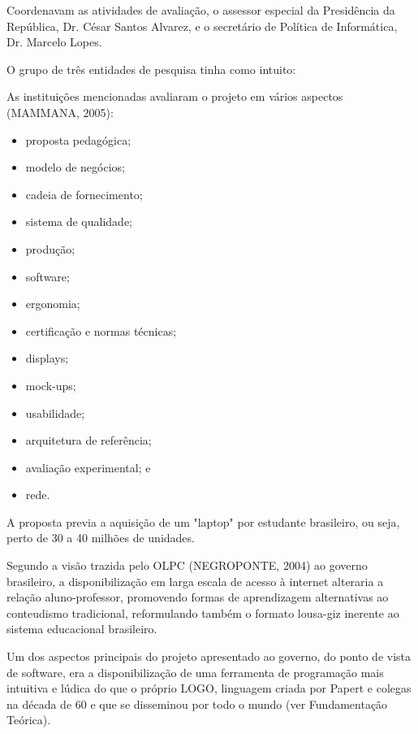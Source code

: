 Coordenavam as atividades de avaliação, o assessor especial da Presidência da República, Dr. César Santos Alvarez, e o secretário de Política de Informática, Dr. Marcelo Lopes.

O grupo de três entidades de pesquisa tinha como intuito:


\noindent\begin{center}\mbox{\centering{}}\end{center}


As instituições mencionadas avaliaram o projeto em vários aspectos  (MAMMANA, 2005):


\begin{itemize}
\item proposta pedagógica;
\item modelo de negócios;
\item cadeia de fornecimento;
\item sistema de qualidade;
\item produção;
\item software;
\item ergonomia;
\item certificação e normas técnicas;
\item displays;
\item mock-ups;
\item usabilidade;
\item arquitetura de referência;
\item avaliação experimental; e
\item rede.
\end{itemize}

A proposta previa a aquisição de um "laptop" por estudante brasileiro, ou seja, perto de 30 a 40 milhões de unidades.

Segundo a visão trazida pelo OLPC  (NEGROPONTE, 2004) ao governo brasileiro, a disponibilização em larga escala de acesso à internet alteraria a relação aluno-professor, promovendo formas de aprendizagem alternativas ao conteudismo tradicional, reformulando também o formato lousa-giz inerente ao sistema educacional brasileiro.

Um dos aspectos principais do projeto apresentado ao governo, do ponto de vista de software, era a disponibilização de uma ferramenta de programação mais intuitiva e lúdica do que o próprio LOGO, linguagem criada por Papert e colegas na década de 60 e que se disseminou por todo o mundo (ver Fundamentação Teórica).

